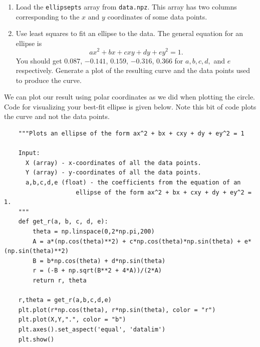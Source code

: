 \begin{problem}
\leavevmode
\begin{enumerate}
\item Load the \texttt{ellipsepts} array from \texttt{data.npz}. This array has two columns corresponding to the $x$ and $y$ coordinates of some data points.
\item Use least squares to fit an ellipse to the data. 
The general equation for an ellipse is
\[
ax^2 + bx + cxy + dy + ey^2 = 1.
\]
You should get  $0.087$, $-0.141$,  $0.159$, $-0.316$, $0.366$ for $a, b, c, d,$ and $e$ respectively. Generate a plot of the resulting curve and the data points used to produce the curve.
\end{enumerate}

We can plot our result using polar coordinates as we did when plotting the circle. Code for visualizing your best-fit ellipse is given below. Note this bit of code plots the curve and not the data points. 

\begin{lstlisting}
    """Plots an ellipse of the form ax^2 + bx + cxy + dy + ey^2 = 1

    Input:
      X (array) - x-coordinates of all the data points.
      Y (array) - y-coordinates of all the data points.
      a,b,c,d,e (float) - the coefficients from the equation of an 
                    ellipse of the form ax^2 + bx + cxy + dy + ey^2 = 1.
    """
    def get_r(a, b, c, d, e):
        theta = np.linspace(0,2*np.pi,200)
        A = a*(np.cos(theta)**2) + c*np.cos(theta)*np.sin(theta) + e*(np.sin(theta)**2)
        B = b*np.cos(theta) + d*np.sin(theta)
        r = (-B + np.sqrt(B**2 + 4*A))/(2*A)
        return r, theta
        
    r,theta = get_r(a,b,c,d,e)
    plt.plot(r*np.cos(theta), r*np.sin(theta), color = "r")
    plt.plot(X,Y,".", color = "b")
    plt.axes().set_aspect('equal', 'datalim')
    plt.show()
\end{lstlisting}

\end{problem}

